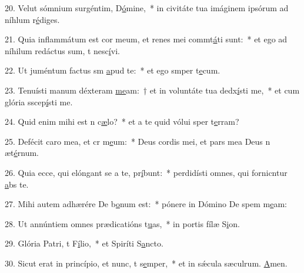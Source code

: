 20. Velut sómnium surgéntim, D\uline{ó}mine,~* in civitáte tua imáginem ipsórum ad níhlum r\uline{é}diges.\par 
21. Quia inflammátum est cor meum, et renes mei commt\uline{á}ti sunt:~* et ego ad níhilum redáctus sum, t nesc\uline{í}vi.\par 
22. Ut juméntum factus sm \uline{a}pud te:~* et ego smper t\uline{e}cum.\par 
23. Tenuísti manum déxteram \uline{me}am:~† et in voluntáte tua dedx\uline{í}sti me,~* et cum glória sscep\uline{í}sti me.\par 
24. Quid enim mihi est n c\uline{æ}lo?~* et a te quid vólui sper t\uline{e}rram?\par 
25. Defécit caro mea, et cr m\uline{e}um:~* Deus cordis mei, et pars mea Deus n æt\uline{é}rnum.\par 
26. Quia ecce, qui elóngant se a te, pr\uline{í}bunt:~* perdidísti omnes, qui fornicntur \uline{a}bs te.\par 
27. Mihi autem adhærére De b\uline{o}num est:~* pónere in Dómino De spem m\uline{e}am:\par 
28. Ut annúntiem omnes prædicatións t\uline{u}as,~* in portis fílæ S\uline{i}on.\par 
29. Glória Patri, t F\uline{í}lio,~* et Spiríti S\uline{a}ncto.\par 
30. Sicut erat in princípio, et nunc, t s\uline{e}mper,~* et in sǽcula sæculrum. \uline{A}men.\par 
